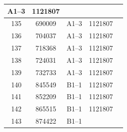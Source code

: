 \documentclass[UTF8,10pt,a4paper,fontset=fandol]{ctexart}
\newcommand{\fieldvalue}[1]{#1}
\begin{document}
\begin{center}
\begin{tabular}{|c|c|c|c|p{3.5cm}|}
\fieldvalue{A1--3} &
\fieldvalue{1121807} & \\ \hline
135 &
\fieldvalue{690009} &
\fieldvalue{A1--3} &
\fieldvalue{1121807} & \\ \hline
136 &
\fieldvalue{704037} &
\fieldvalue{A1--3} &
\fieldvalue{1121807} & \\ \hline
137 &
\fieldvalue{718368} &
\fieldvalue{A1--3} &
\fieldvalue{1121807} & \\ \hline
138 &
\fieldvalue{724031} &
\fieldvalue{A1--3} &
\fieldvalue{1121807} & \\ \hline
139 &
\fieldvalue{732733} &
\fieldvalue{A1--3} &
\fieldvalue{1121807} & \\ \hline
140 &
\fieldvalue{845549} &
\fieldvalue{B1--1} &
\fieldvalue{1121807} & \\ \hline
141 &
\fieldvalue{852209} &
\fieldvalue{B1--1} &
\fieldvalue{1121807} & \\ \hline
142 &
\fieldvalue{865515} &
\fieldvalue{B1--1} &
\fieldvalue{1121807} & \\ \hline
143 &
\fieldvalue{874422} &
\fieldvalue{B1--1} &

\end{tabular}
\end{center}
\end{document}
